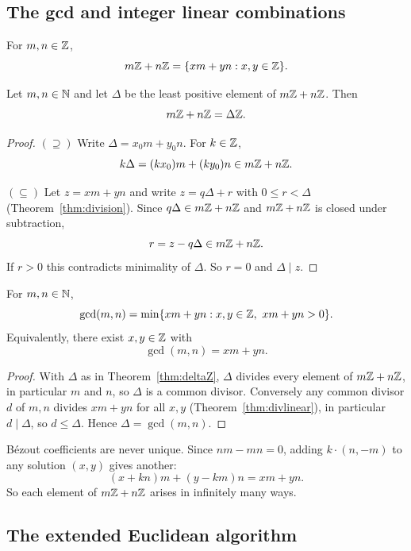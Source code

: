 \documentclass[11pt]{article}
\begin{document}
\subsection{The gcd and integer linear combinations}
\label{sec:bezout}

\begin{definition}
For $m,n\in\mathbb{Z}$,
\[
m\mathbb{Z}+n\mathbb{Z}=\{xm+yn : x,y\in\mathbb{Z}\}.
\]
\end{definition}

\begin{theorem}
\label{thm:deltaZ}
Let $m,n\in\mathbb{N}$ and let $\Delta$ be the least positive element of $m\mathbb{Z}+n\mathbb{Z}$. Then
\[
m\mathbb{Z}+n\mathbb{Z}=\Delta\mathbb{Z}.
\]
\end{theorem}

\begin{proof}
\noindent$(\supseteq)$ Write $\Delta=x_0m+y_0n$. For $k\in\mathbb{Z}$,
\[
k\Delta=(kx_0)m+(ky_0)n\in m\mathbb{Z}+n\mathbb{Z}.
\]

\medskip
\noindent$(\subseteq)$ Let $z=xm+yn$ and write $z=q\Delta+r$ with $0\le r<\Delta$ (Theorem~\ref{thm:division}). Since $q\Delta\in m\mathbb{Z}+n\mathbb{Z}$ and $m\mathbb{Z}+n\mathbb{Z}$ is closed under subtraction,
\[
r=z-q\Delta\in m\mathbb{Z}+n\mathbb{Z}.
\]
If $r>0$ this contradicts minimality of $\Delta$. So $r=0$ and $\Delta\mid z$.
\end{proof}

\begin{theorem}[Bézout]
\label{thm:bezout}
For $m,n\in\mathbb{N}$,
\[
\gcd(m,n)=\min\{xm+yn : x,y\in\Z,\ xm+yn>0\}.
\]
Equivalently, there exist $x,y\in\mathbb{Z}$ with
\[
\gcd(m,n)=xm+yn.
\]
\end{theorem}

\begin{proof}
With $\Delta$ as in Theorem~\ref{thm:deltaZ}, $\Delta$ divides every element of $m\mathbb{Z}+n\mathbb{Z}$, in particular $m$ and $n$, so $\Delta$ is a common divisor. Conversely any common divisor $d$ of $m,n$ divides $xm+yn$ for all $x,y$ (Theorem~\ref{thm:divlinear}), in particular $d\mid\Delta$, so $d\le\Delta$. Hence $\Delta=\gcd(m,n)$.
\end{proof}

\begin{note}
Bézout coefficients are never unique. Since $nm-mn=0$, adding $k\cdot(n,-m)$ to any solution $(x,y)$ gives another:
\[
(x+kn)m+(y-km)n = xm+yn.
\]
So each element of $m\mathbb{Z}+n\mathbb{Z}$ arises in infinitely many ways.
\end{note}

\subsection{The extended Euclidean algorithm}
\label{sec:eea}
\end{document}
